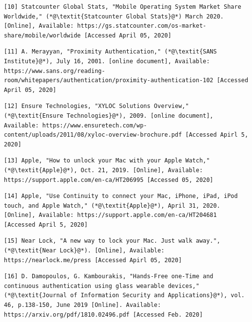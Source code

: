 \documentclass[letterpaper,twocolumn,10pt]{article}
\begin{document}
{{{\small
\begin{lstlisting}
[10] Statcounter Global Stats, "Mobile Operating System Market Share Worldwide," (*@\textit{Statcounter Global Stats}@*) March 2020. [Online], Available: https://gs.statcounter.com/os-market-share/mobile/worldwide [Accessed April 05, 2020]
\end{lstlisting}
}

{\small
\begin{lstlisting}
[11] A. Merayyan, "Proximity Authentication," (*@\textit{SANS Institute}@*), July 16, 2001. [online document], Available: https://www.sans.org/reading-room/whitepapers/authentication/proximity-authentication-102 [Accessed April 05, 2020]
\end{lstlisting}
}

{\small
\begin{lstlisting}
[12] Ensure Technologies, "XYLOC Solutions Overview," (*@\textit{Ensure Technologies}@*), 2009. [online document], Available: https://www.ensuretech.com/wp-content/uploads/2011/08/xyloc-overview-brochure.pdf [Accessed Apirl 5, 2020]
\end{lstlisting}
}

{\small
\begin{lstlisting}
[13] Apple, "How to unlock your Mac with your Apple Watch," (*@\textit{Apple}@*), Oct. 21, 2019. [Online], Available: https://support.apple.com/en-ca/HT206995 [Accessed 05, 2020]
\end{lstlisting}
}

{\small
\begin{lstlisting}
[14] Apple, "Use Continuity to connect your Mac, iPhone, iPad, iPod touch, and Apple Watch," (*@\textit{Apple}@*), April 31, 2020. [Online], Available: https://support.apple.com/en-ca/HT204681 [Accessed April 5, 2020]
\end{lstlisting}
}

{\small
\begin{lstlisting}
[15] Near Lock, "A new way to lock your Mac. Just walk away.", (*@\textit{Near Lock}@*). [Online], Available: https://nearlock.me/press [Accessed Apirl 05, 2020]
\end{lstlisting}
}

{\small
\begin{lstlisting}
[16] D. Damopoulos, G. Kambourakis, "Hands-Free one-Time and continuous authentication using glass wearable devices," (*@\textit{Journal of Information Security and Applications}@*), vol. 46, p.138-150, June 2019 [Online]. Available: https://arxiv.org/pdf/1810.02496.pdf [Accessed Feb. 2020]
\end{lstlisting}
}

}}
\end{document}
